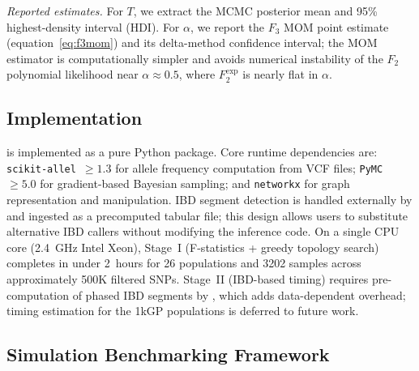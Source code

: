 \emph{Reported estimates.}
For $T$, we extract the MCMC posterior mean and 95\% highest-density
interval (HDI).
For $\alpha$, we report the $F_3$ MOM point estimate (equation~\ref{eq:f3mom})
and its delta-method confidence interval; the MOM estimator is computationally
simpler and avoids numerical instability of the $F_2$ polynomial likelihood
near $\alpha \approx 0.5$, where $F_2^{\mathrm{exp}}$ is nearly flat in $\alpha$.

\subsection*{Implementation}

\hapgraph{} is implemented as a pure Python package.
Core runtime dependencies are: \texttt{scikit-allel}~$\geq 1.3$
\citep{Miles2021} for allele frequency computation from VCF files;
\texttt{PyMC}~$\geq 5.0$ \citep{AbrilPimentel2023} for gradient-based
Bayesian sampling; and \texttt{networkx} for graph representation and
manipulation.
IBD segment detection is handled externally by \hapibd{} \citep{Browning2020}
and ingested as a precomputed tabular file; this design allows users to
substitute alternative IBD callers without modifying the inference code.
On a single CPU core (2.4~GHz Intel Xeon), Stage~I (F-statistics + greedy
topology search) completes in under 2~hours for 26 populations and 3202
samples across approximately 500K filtered SNPs.
Stage~II (IBD-based timing) requires pre-computation of phased IBD segments
by \hapibd{}, which adds data-dependent overhead; timing estimation for the
1kGP populations is deferred to future work.

\subsection*{Simulation Benchmarking Framework}

